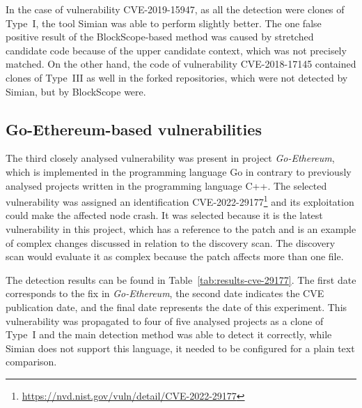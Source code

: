 In the case of vulnerability CVE-2019-15947, as all the detection were clones of Type~I, the tool Simian was able to perform
slightly better. The one false positive result of the BlockScope-based method was caused by stretched candidate code because
of the upper candidate context, which was not precisely matched.
On the other hand, the code of vulnerability CVE-2018-17145 contained clones of Type~III as well in the forked repositories,
which were not detected by Simian, but by BlockScope were.

\subsection*{Go-Ethereum-based vulnerabilities}
The third closely analysed vulnerability was present in project \emph{Go-Ethereum}, which is implemented in the programming language Go
in contrary to previously analysed projects written in the programming language C++. The selected vulnerability was assigned an identification
CVE-2022-29177\footnote{\href{https://nvd.nist.gov/vuln/detail/CVE-2022-29177}{https://nvd.nist.gov/vuln/detail/CVE-2022-29177}}
and its exploitation could make the affected node crash. It was selected because it is the latest vulnerability in this project,
which has a reference to the patch and is an example of complex changes discussed in relation to the discovery scan.
The discovery scan would evaluate it as complex because the patch affects more than one file.

The detection results can be found in Table~\ref{tab:results-cve-29177}.
The first date corresponds to the fix in \emph{Go-Ethereum}, the second date indicates the CVE publication date, and the final date represents the date of this experiment.
This vulnerability was propagated to four of five analysed projects as a clone of Type~I and the main detection method
was able to detect it correctly, while Simian does not support this language, it needed to be configured for a plain text
comparison.

